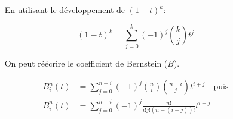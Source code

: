 \documentclass{amsart}
\begin{document}
  \pagestyle{empty}

  \centerline{$\qquad$ En utilisant le développement de ${\left({1-t}\right)}^{k}$:}

  \begin{equation*}
    {\left({1-t}\right)}^{k} = \sum_{j=0}^{k} {{\left({-1}\right)}^{j} \binom{k}{j} {t}^{j}}
  \end{equation*}

  \centerline{$\qquad$ On peut réécrire le coefficient de Bernstein ($B$).}

  \begin{equation*}
    \begin{split}
      {B}_{i}^{n} {\left({t}\right)} & = \sum_{j=0}^{n-i} {{\left({-1}\right)}^{j}} {\binom{n}{i}} {\binom{n-i}{j}} {t^{i+j}} \quad \text{puis} \\
      {B}_{i}^{n} {\left({t}\right)} & = \sum_{j=0}^{n-i} {{\left({-1}\right)}^{j}} {\frac{n!}{{i!}{j!}{\left({n-\left({i+j}\right)}\right)!}}} {{t}^{i+j}} \\
    \end{split}
  \end{equation*}
\end{document}

